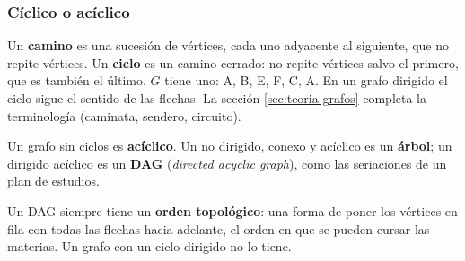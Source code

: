 \documentclass[11pt,letterpaper]{article}
\begin{document}
\subsubsection*{Cíclico o acíclico}

Un \textbf{camino} es una sucesión de vértices, cada uno adyacente al
siguiente, que no repite vértices. Un \textbf{ciclo} es un camino
cerrado: no repite vértices salvo el primero, que es también el
último. $G$ tiene uno: A, B, E, F, C, A. En un grafo dirigido el
ciclo sigue el sentido de las flechas. La
sección \ref{sec:teoria-grafos} completa la terminología (caminata,
sendero, circuito).

Un grafo sin ciclos es \textbf{acíclico}. Un no dirigido, conexo y
acíclico es un \textbf{árbol}; un dirigido acíclico es un
\textbf{DAG} (\textit{directed acyclic graph}), como las seriaciones
de un plan de estudios.

\begin{center}
\end{center}

Un DAG siempre tiene un \textbf{orden topológico}: una forma de poner
los vértices en fila con todas las flechas hacia adelante, el orden en
que se pueden cursar las materias. Un grafo con un ciclo dirigido no
lo tiene.
\end{document}
